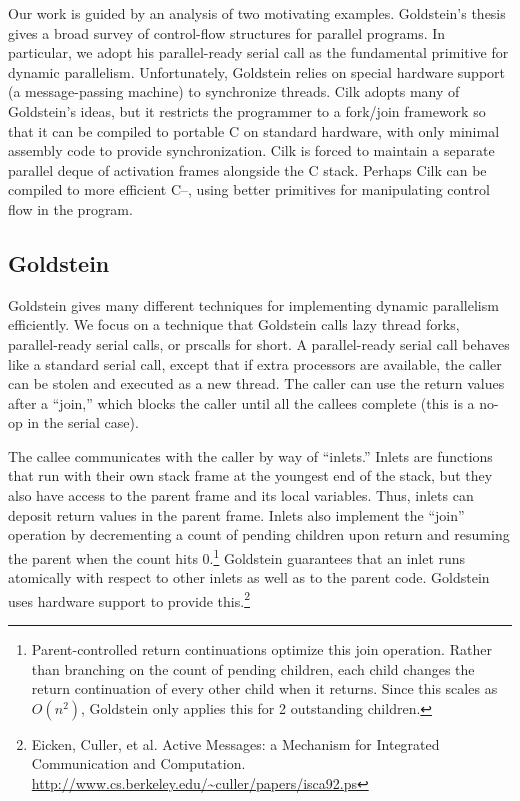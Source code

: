 \documentclass[twoside,12pt]{article}
\begin{document}
Our work is guided by an analysis of two motivating examples.  Goldstein's thesis gives a broad survey of control-flow structures for parallel programs.  In particular, we adopt his parallel-ready serial call as the fundamental primitive for dynamic parallelism.  Unfortunately, Goldstein relies on special hardware support (a message-passing machine) to synchronize threads.
Cilk adopts many of Goldstein's ideas, but it restricts the programmer to a fork/join framework  so that it can be compiled to portable C on standard hardware, with only minimal assembly code to provide synchronization.  Cilk is forced to maintain a separate parallel deque of activation frames alongside the C stack.  Perhaps Cilk can be compiled to more efficient C--, using better primitives for manipulating control flow in the program.


\subsection{Goldstein}

Goldstein gives many different techniques for implementing dynamic parallelism
efficiently.  We focus on a technique that Goldstein calls lazy thread forks,
parallel-ready serial calls, or prscalls for short.  A parallel-ready serial call
behaves like a standard serial call, except that if extra processors are
available, the caller can be stolen and executed as a new thread.  The caller
can use the return values after a ``join,'' which blocks the caller until all
the callees complete (this is a no-op in the serial case).

The callee communicates with the caller by way of ``inlets.''   Inlets are functions that run with
their own stack frame at the youngest end of the stack, but they also have
access to the parent frame and its local variables. Thus, inlets can deposit return values in the parent frame.  Inlets also implement the ``join'' operation by decrementing a count of pending children upon return and resuming the parent when the count hits 0.\footnote{Parent-controlled return continuations optimize this join operation.  Rather than branching on the count of pending children, each child changes the return continuation of every other child when it returns.  Since this scales as $O(n^2)$, Goldstein only applies this for 2 outstanding children.}  Goldstein guarantees that an inlet runs atomically with respect to other inlets as well as to the parent code.  Goldstein uses hardware support to provide this.\footnote{Eicken, Culler, et al.  Active Messages: a Mechanism for Integrated Communication and Computation.  \url{http://www.cs.berkeley.edu/~culler/papers/isca92.ps}}
\end{document}
